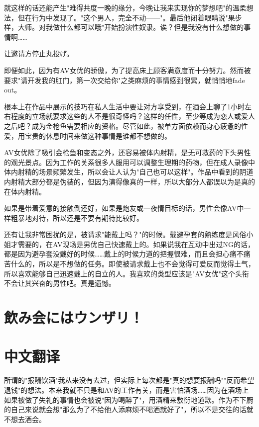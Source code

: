 \documentclass[12pt,UTF8]{ctexbook}
\begin{document}
就这样的话还能产生"难得共度一晚的缘分，今晚让我来实现你的梦想吧"的温柔想法，但在行为中发现了。"这个男人，完全不动——"。最后他闭着眼睛说"果步样，大师。对我做什么都可以哦"开始扮演性奴隶。诶？但是我没有什么想做的事情啊……

让邀请方停止丸投げ。

即便如此，因为有AV女优的骄傲，为了提高床上顾客满意度而十分努力。然而被要求"请开发我的肛门，第一次交给你"之类麻烦的事情感到很累，就悄悄地fade out。

根本上在作品中展示的技巧在私人生活中要让对方享受到，在酒会上聊了1小时左右程度的立场就要求这些的人不是很奇怪吗？这样的任性，至少等成为恋人或爱人之后吧？成为金枪鱼需要相应的资格。尽管如此，被单方面依赖而身心疲惫的性爱，用宝贵的休息时间来做这种事情是谁都不想做的。

AV女优除了吸引金枪鱼和变态之外，还容易被体内射精，是无可救药的下头男性的观光景点。因为工作的关系很多人服用可以调整生理期的药物，但在成人录像中体内射精的场景频繁发生，所以会让人认为"自己也可以这样"。作品中看到的阴道内射精大部分都是伪装的，但因为演得像真的一样，所以大部分人都误以为是真的在体内射精。

如果是带着爱意的接触倒还好，如果是炮友或一夜情目标的话，男性会像AV中一样粗暴地对待，所以还是不要有期待比较好。

还有让我非常困扰的是，被请求"能戴上吗？"的时候。戴避孕套的熟练度是风俗小姐才需要的，在AV现场是男优自己快速戴上的。如果说我在互动中出过NG的话，都是因为避孕套没戴好的时候……戴上的时候力道的把握很难，而且会担心痛不痛苦什么的，所以是不想做的任务。即使被请求戴上也不会觉得可爱反而觉得土气，所以喜欢能够自己迅速戴上的自立的人。我喜欢的类型应该是"AV女优"这个头衔不会让其兴奋的男性吧。真是遗憾。

\switchcolumn

\section{飲み会にはウンザリ！}

\switchcolumn

\section*{中文翻译}

所谓的"报酬饮酒"我从来没有去过，但实际上每次都是"真的想要报酬吗""反而希望退钱"的想法。本来我就不只是和AV的工作有关，而是害怕酒场……因为在酒场上如果被做了失礼的事情也会被说"因为喝醉了"，用酒精来敷衍地道歉。作为不下厨的自己来说就会想"那么为了不给他人添麻烦不喝酒就好了"，所以不是交往的话就不想去酒会。
\end{document}
